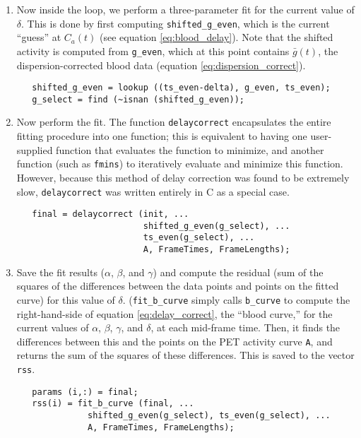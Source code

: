 \documentclass[12pt]{article}
\def\code#1{{\tt #1}}
\begin{document}
\begin{enumerate}
\item Now inside the loop, we perform a three-parameter fit for the
  current value of $\delta$.  This is done by first computing
  \code{shifted\_g\_even}, which is the current ``guess'' at $C_a (t)$
  (see equation \ref{eq:blood_delay}).  Note that the shifted
  activity is computed from \code{g\_even}, which at this point
  contains $\bar g (t)$, the dispersion-corrected blood data (equation
  \ref{eq:dispersion_correct}).
\begin{verbatim}
   shifted_g_even = lookup ((ts_even-delta), g_even, ts_even);
   g_select = find (~isnan (shifted_g_even));
\end{verbatim}

\item Now perform the fit.  The function \code{delaycorrect}
  encapsulates the entire fitting procedure into one function; this is
  equivalent to having one user-supplied function that evaluates the
  function to minimize, and another function (such as \code{fmins}) to
  iteratively evaluate and minimize this function.  However, because
  this method of delay correction was found to be extremely slow,
  \code{delaycorrect} was written entirely in C as a special case.

\begin{verbatim}
   final = delaycorrect (init, ...
                         shifted_g_even(g_select), ...
                         ts_even(g_select), ...
                         A, FrameTimes, FrameLengths);
\end{verbatim}

\item Save the fit results ($\alpha$, $\beta$, and $\gamma$) and
  compute the residual (sum of the squares of the differences between
  the data points and points on the fitted curve) for this value of
  $\delta$.  (\code{fit\_b\_curve} simply calls \code{b\_curve} to
  compute the right-hand-side of equation \ref{eq:delay_correct}, the
  ``blood curve,'' for the current values of $\alpha$, $\beta$,
  $\gamma$, and $\delta$, at each mid-frame time.  Then, it finds the
  differences between this and the points on the PET activity curve
  \code{A}, and returns the sum of the squares of these differences.
  This is saved to the vector \code{rss}.
\begin{verbatim}
   params (i,:) = final;
   rss(i) = fit_b_curve (final, ...
              shifted_g_even(g_select), ts_even(g_select), ...
              A, FrameTimes, FrameLengths);
\end{verbatim}


\end{enumerate}
\end{document}
